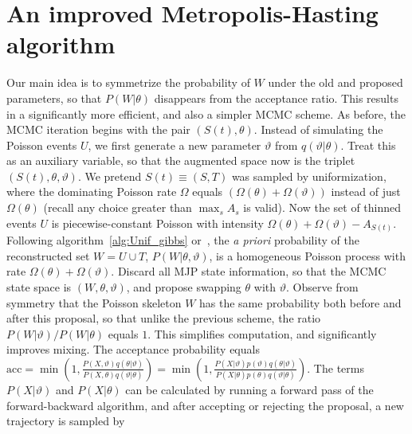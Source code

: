 
\section{An improved Metropolis-Hasting algorithm}
\vspace{-.05in}
Our main idea is to symmetrize the probability of $W$ under the old and 
proposed parameters, so that 
$P(W|\theta)$ disappears from the acceptance ratio. This results
in a significantly more efficient, and also a simpler MCMC scheme.
As before, the MCMC iteration begins with the pair $(S(t), \theta)$. 
Instead of simulating the Poisson events $U$, we first generate a new 
parameter $\vartheta$ from $q(\vartheta|\theta)$. Treat this as an 
auxiliary variable, so that the augmented space now is the triplet 
$(S(t), \theta,\vartheta)$. We pretend $S(t) \equiv (S,T)$ was sampled by  
uniformization, where the dominating Poisson rate $\Omega$ equals 
$(\Omega(\theta) + \Omega(\vartheta))$ instead of just $\Omega(\theta)$ 
(recall any choice greater than $\max_s A_s$ is valid).
Now the set of thinned events $U$ is piecewise-constant
Poisson with intensity $\Omega(\theta) + \Omega(\vartheta) - 
A_{S(t)}$. Following algorithm~\ref{alg:Unif_gibbs} or~\cite{RaoTeh13}, 
the {\em a priori} probability of the reconstructed set $W = U \cup T$, 
$P(W|\theta,\vartheta)$, is a homogeneous Poisson 
process with rate $\Omega(\theta) + \Omega(\vartheta)$. Discard all 
MJP state information, so that the MCMC state space is $(W, \theta, \vartheta)$,
and propose swapping $\theta$ with $\vartheta$. 
Observe from
symmetry that the Poisson skeleton $W$ has the same probability both
before and after this proposal, so that unlike the previous scheme,
the ratio $P(W|\vartheta)/P(W|\theta)$ equals $1$.  This simplifies 
computation, and significantly improves mixing.
The acceptance probability 
equals
$ \text{acc} = 
  \min\left(1, \frac{P(X,\vartheta)q(\theta|\vartheta)}
   {P(X,\theta)q(\vartheta|\theta)}\right) = 
  \min\left(1, \frac{P(X|\vartheta)p(\vartheta)q(\theta|\vartheta)}
   {P(X|\theta)p(\theta)q(\vartheta|\theta)}\right).
   $
   The terms $P(X|\vartheta)$ and  $P(X|\theta)$ can be calculated by 
   running a forward pass of the forward-backward algorithm, and after
   accepting or rejecting the proposal, a new trajectory is sampled by
